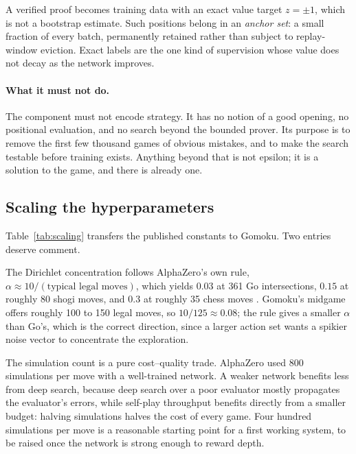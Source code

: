A verified proof becomes training data with an exact value target $z = \pm1$,
which is not a bootstrap estimate. Such positions belong in an \emph{anchor set}:
a small fraction of every batch, permanently retained rather than subject to
replay-window eviction. Exact labels are the one kind of supervision whose value
does not decay as the network improves.

\paragraph{What it must not do.} The component must not encode strategy. It has
no notion of a good opening, no positional evaluation, and no search beyond the
bounded prover. Its purpose is to remove the first few thousand games of obvious
mistakes, and to make the search testable before training exists. Anything beyond
that is not epsilon; it is a solution to the game, and there is already one.

\subsection{Scaling the hyperparameters}
\label{sec:scaling}

Table~\ref{tab:scaling} transfers the published constants to Gomoku. Two entries
deserve comment.

The Dirichlet concentration follows AlphaZero's own rule, $\alpha \approx
10/(\text{typical legal moves})$, which yields $0.03$ at 361 Go intersections,
$0.15$ at roughly 80 shogi moves, and $0.3$ at roughly 35 chess moves
\citep{silver2018alphazero}. Gomoku's midgame offers roughly 100 to 150 legal
moves, so $10/125 \approx 0.08$; the rule gives a smaller $\alpha$ than Go's,
which is the correct direction, since a larger action set wants a spikier noise
vector to concentrate the exploration.

The simulation count is a pure cost--quality trade. AlphaZero used 800
simulations per move with a well-trained network. A weaker network benefits less
from deep search, because deep search over a poor evaluator mostly propagates the
evaluator's errors, while self-play throughput benefits directly from a smaller
budget: halving simulations halves the cost of every game. Four hundred
simulations per move is a reasonable starting point for a first working system,
to be raised once the network is strong enough to reward depth.


